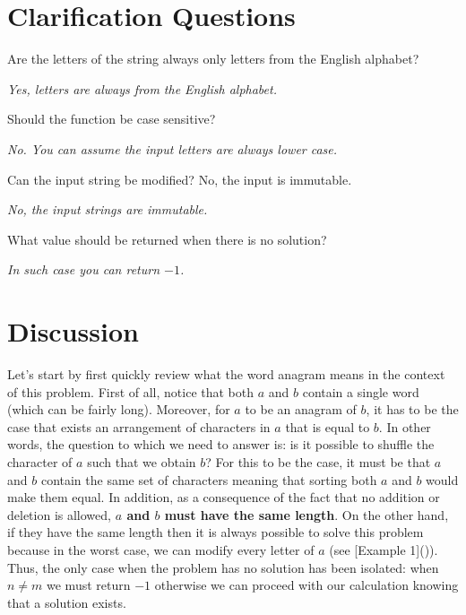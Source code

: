 \section{Clarification Questions}

\begin{QandA}
	\item Are the letters of the string always only letters from the English alphabet?  
	\begin{answered}
		\textit{Yes, letters are always from the English alphabet.}
	\end{answered}
	
	\item Should the function be case sensitive? 
	\begin{answered}
		\textit{ No. You can assume the input letters are always lower case.}
	\end{answered}
	\item Can the input string be modified? No, the input is immutable.
	\begin{answered}
		\textit{No, the input strings are immutable.}
	\end{answered}

	\item What value should be returned when there is no solution?
	\begin{answered}
		\textit{In such case you can return $-1$.}
	\end{answered}
\end{QandA}

\section{Discussion}

Let's start by first quickly review what the word anagram means in the context of this problem. First of all, notice that both $a$ and $b$ contain a single word (which can be fairly long).
Moreover, for $a$ to be an anagram
of $b$, it has to be the case that exists an arrangement of characters in $a$ that is equal to $b$.
In other words, the question to which we need to answer is: is it possible to shuffle the character of $a$ such that we obtain $b$?
For this to be the case, it must be that $a$ and $b$ contain the same set of characters meaning that sorting both $a$ and $b$ would make them equal.
In addition, as a consequence of the fact that no addition or deletion
is allowed, \textbf{$a$ and $b$ must have the same length}. 
On the other hand, if they have the same length then it is always
possible to solve this problem because in the worst case, we can modify every letter of $a$ (see [Example 1]()).
Thus, the only case when the problem has no solution has been isolated: when $n \neq m$ we must return $-1$ otherwise we can proceed with our calculation knowing that a solution exists.


